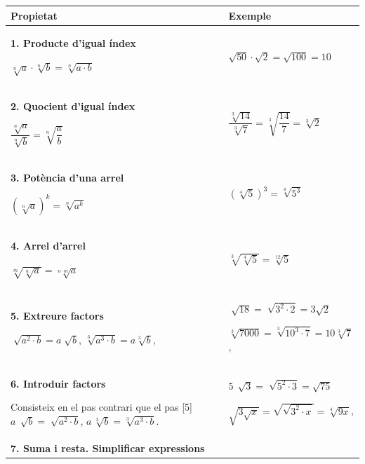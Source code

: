 \begin{longtable}[h]{|>{\raggedright}p{}|p{}|}
	\hline %
	\rowcolor{lightgray}
	
	\textbf{Propietat} & \textbf{Exemple} \\   [0.5ex] 
   \hline
	
	
	\textbf{1. Producte d'igual índex}
	
	$\sqrt[n]{a} \cdot \sqrt[n]{b} = \sqrt[n]{a\cdot b}$
	&   $\sqrt{50} \cdot \sqrt{2} = \sqrt{100}=10$ \\ \hline
	\textbf{2. Quocient d'igual índex }
	
	$\dfrac{\sqrt[n]{a}}{\sqrt[n]{b}} = \sqrt[n]{\dfrac{a}{b}}$
	&   $\dfrac{\sqrt[3]{14}}{\sqrt[3]{7}} = \sqrt[3]{\dfrac{14}{7}}=\sqrt[3]{2}$ \\ \hline
	
	\textbf{3. Potència d'una arrel }
	
	$\left( \sqrt[n]{a} \right)^k = \sqrt[n]{a^k} $
	&   $\left( \sqrt[4]{5} \right)^3 = \sqrt[4]{5^3} $ \\ \hline
	
	\textbf{4. Arrel d'arrel }
	
	$\sqrt[m]{ \sqrt[n]{a} } = \sqrt[n\cdot m]{a} $
	
	&  $\sqrt[3]{ \sqrt[4]{5} } = \sqrt[12]{5} $ \\ \hline
	
	
	\textbf{5. Extreure factors }
	
	$\sqrt[]{a^2 \cdot b}  = a\sqrt[]{b}$, 
	$\sqrt[3]{a^3 \cdot b}  = a\sqrt[3]{b}$, 
	
	&  $\sqrt[]{ 18 } = \sqrt[]{3^2 \cdot 2} = 3 \sqrt{2} $
	
	$\sqrt[3]{ 7000 } = \sqrt[3]{10^3 \cdot 7} = 10 \sqrt [3]{7} $,     
	\\ \hline
	 
	\textbf{6. Introduir factors }
	
	Consisteix en el pas contrari que el pas [5]
	$a\, \sqrt[]{b} = \sqrt[]{a^2 \cdot b}$, \quad
	$a\, \sqrt[3]{b} =\sqrt[3]{a^3 \cdot b}$.
	
	&    
	\par
	
	$5\, \sqrt[]{3} = \sqrt[]{5^2 \cdot 3}=\sqrt{75}$
	
	$\sqrt{3\sqrt{x}}= \sqrt{\sqrt{3^2 \cdot x}}=\sqrt[4]{9x}$, 
	
	\\ \hline
	\textbf{7. Suma i resta. Simplificar expressions}
	

\end{longtable}
